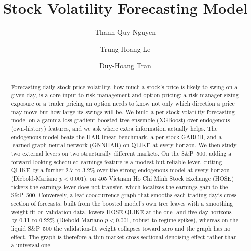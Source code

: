 \documentclass[runningheads]{llncs}
\begin{document}
\title{Stock Volatility Forecasting Model}

\author{Thanh-Quy Nguyen \and Trung-Hoang Le \and Duy-Hoang Tran}

\maketitle

\begin{abstract}
Forecasting daily stock-price volatility, how much a stock's price is likely to swing on a given day,
is a core input to risk management and option pricing: a risk manager sizing exposure or a trader
pricing an option needs to know not only which direction a price may move but how large its swings
will be. We build a per-stock volatility forecasting model on a gamma-loss gradient-boosted tree
ensemble (XGBoost) over endogenous (own-history) features, and we ask where extra information actually helps. The
endogenous model beats the HAR linear benchmark, a per-stock GARCH, and a learned graph
neural network (GNNHAR) on QLIKE at every horizon. We then study two external levers on two
structurally different markets. On the S\&P~500, adding a forward-looking scheduled-earnings feature
is a modest but reliable lever, cutting QLIKE by a further 2.7 to 3.2\% over the strong endogenous
model at every horizon (Diebold-Mariano $p<0.001$); on 405 Vietnam Ho Chi Minh Stock Exchange (HOSE)
tickers the earnings lever does not transfer, which localizes the earnings gain to the S\&P~500.
Conversely, a leaf-cooccurrence graph that smooths each trading day's cross-section of forecasts,
built from the boosted model's own tree leaves with a smoothing weight fit on validation data, lowers
HOSE QLIKE at the one- and five-day horizons by 0.11 to 0.22\% (Diebold-Mariano $p<0.001$, robust to
regime spikes), whereas on the liquid S\&P~500 the validation-fit weight collapses toward zero and the
graph has no effect. The graph is therefore a thin-market cross-sectional denoising effect rather than a
universal one.
\end{abstract}
\end{document}
